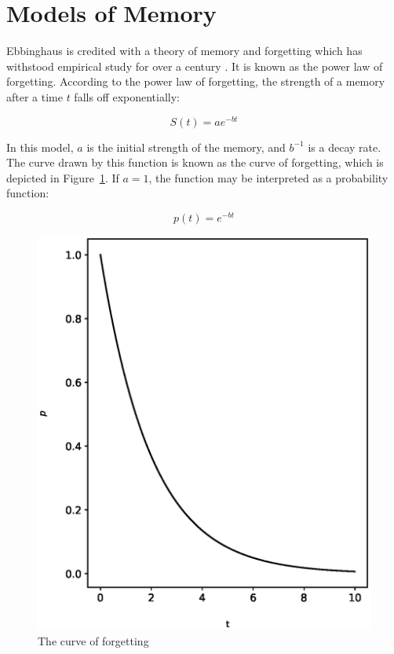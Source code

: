 \section{Models of Memory}

Ebbinghaus is credited with a theory of memory and forgetting which has
withstood empirical study for over a century \cite{ebbinghaus}. It is known as
the power law of forgetting.  According to the power law of forgetting, the
strength of a memory after a time $t$ falls off exponentially: 

\begin{equation}
\label{eq:ebbinghaus}
 S(t) = ae^{-bt}
\end{equation}

In this model, $a$ is the initial strength of the memory, and $b^{-1}$ is a
decay rate.  The curve drawn by this function is known as the curve of
forgetting, which is depicted in Figure~\ref{fig:forgetting}.  If $a=1$, the
function may be interpreted as a probability function:

\begin{equation}
\label{eq:ebbinghaus}
 p(t) = e^{-bt}
\end{equation}

\begin{figure}[p!]
 \label{fig:forgetting}
 \includegraphics{fig/forgetting.eps} 
 \caption{The curve of forgetting}
\end{figure}

